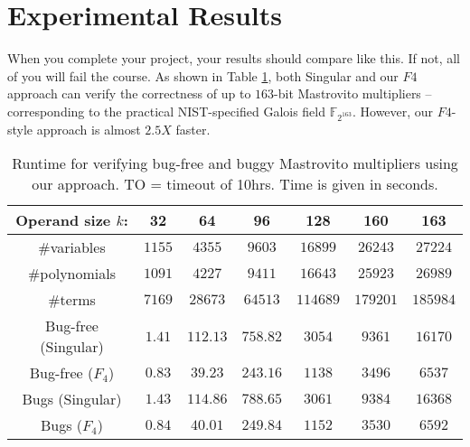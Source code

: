 \section{Experimental Results}

When you complete your project, your results should compare like
this. If not, all of you will fail the course. As shown in Table
\ref{tab:ourmas}, both {\sc Singular} and our 
$F4$ approach can verify the correctness of up to 
$163$-bit Mastrovito multipliers -- corresponding to the practical
NIST-specified Galois field ${\mathbb{F}}_{2^{163}}$.  However, our
$F4$-style approach is almost $2.5X$ faster. 

\begin{table}[htb!]
\begin{center}
\caption{ Runtime for verifying bug-free and buggy Mastrovito
  multipliers using our approach. TO = timeout of 10hrs. Time is given
  in seconds.}  
\label{tab:ourmas}
\begin{tabular}{|c||c|c|c|c|c|c|} \hline 
Operand size $k$: & 32 &  64 & 96 & 128  &160 &163\\
\hline
\#variables   &$1155$ 		&$4355$ 	&$9603$ 	&$16899$ 	&$26243$ 	&$27224$ \\
\hline
\#polynomials &$1091$ 		&$4227$ 	&$9411$ 	&$16643$ 	&$25923$ 	&$26989$ \\
\hline
\#terms        &$7169$ 	&$28673$ 	&$64513$ 	&$114689$ 	&$179201$ 	&$185984$ \\
\hline
\hline
Bug-free (Singular) &$1.41$ 		&$112.13$ 	&$758.82$ 	&$3054$ 	&$9361$ 	&$16170$ \\
\hline
Bug-free ($F_4$) &$0.83$ 		&$39.23$ 	&$243.16$ 	&$1138$ 	&$3496$ 	&$6537$ \\
\hline \hline
Bugs (Singular) &$1.43$		&$114.86$ 	&$788.65$ 	&$3061$  	&$9384$ 	&$16368$\\
\hline
Bugs ($F_4$)  &$0.84$		&$40.01$ 	&$249.84$ 	&$1152$  	&$3530$ 	&$6592$\\
\hline
\end{tabular}
\end{center}
\end{table}

